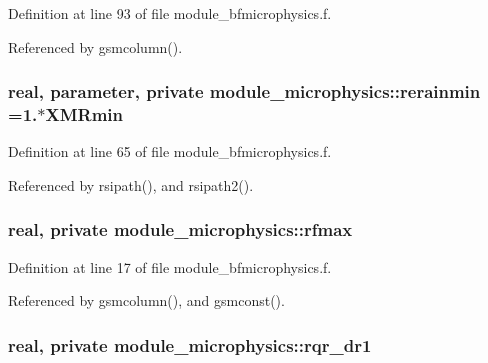 Definition at line 93 of file module\+\_\+bfmicrophysics.\+f.



Referenced by gsmcolumn().

\subsubsection[{\texorpdfstring{rerainmin}{rerainmin}}]{\setlength{\rightskip}{0pt plus 5cm}real, parameter, private module\+\_\+microphysics\+::rerainmin =1.$\ast$X\+M\+Rmin\hspace{0.3cm}{\ttfamily [private]}}\hypertarget{namespacemodule__microphysics_a86f747f0e2a77aee3a2c8270a0f2fc6d}{}\label{namespacemodule__microphysics_a86f747f0e2a77aee3a2c8270a0f2fc6d}


Definition at line 65 of file module\+\_\+bfmicrophysics.\+f.



Referenced by rsipath(), and rsipath2().

\subsubsection[{\texorpdfstring{rfmax}{rfmax}}]{\setlength{\rightskip}{0pt plus 5cm}real, private module\+\_\+microphysics\+::rfmax\hspace{0.3cm}{\ttfamily [private]}}\hypertarget{namespacemodule__microphysics_a733f21868223ca01612507355d0b85be}{}\label{namespacemodule__microphysics_a733f21868223ca01612507355d0b85be}


Definition at line 17 of file module\+\_\+bfmicrophysics.\+f.



Referenced by gsmcolumn(), and gsmconst().

\subsubsection[{\texorpdfstring{rqr\+\_\+dr1}{rqr_dr1}}]{\setlength{\rightskip}{0pt plus 5cm}real, private module\+\_\+microphysics\+::rqr\+\_\+dr1\hspace{0.3cm}{\ttfamily [private]}}\hypertarget{namespacemodule__microphysics_ada6772b0bc7347f6ebb3c31f2df43563}{}\label{namespacemodule__microphysics_ada6772b0bc7347f6ebb3c31f2df43563}


